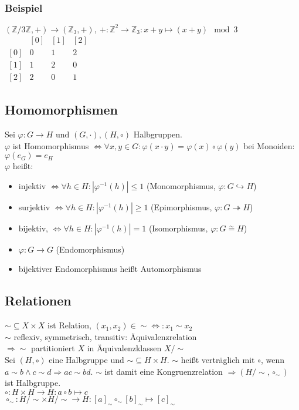     \subsubsection{Beispiel}
    $(\mathds{Z}/3\mathds{Z},+)\rightarrow (\mathds{Z}_3,+),\ +:\mathds{Z}^2\rightarrow \mathds{Z}_3:x+y\mapsto (x+y)\mod 3$\\
    \begin{math}
        \begin{array}
            {c|ccc}
            & \left[0\right] & \left[1\right] & \left[2\right]\\\hline
            \left[0\right] & 0 & 1 & 2\\
            \left[1\right] & 1 & 2 & 0\\
            \left[2\right] & 2 & 0 & 1
        \end{array}
    \end{math}
    \subsection{Homomorphismen}
        Sei $\varphi: G\rightarrow H$ und $(G,\cdot),(H,\circ)$ Halbgruppen.\\
        $\varphi$ ist Homomorphismus $\Leftrightarrow\forall x,y\in G: \varphi(x\cdot y)=\varphi(x)\circ\varphi(y)$ bei Monoiden: $\varphi(e_G)=e_H$\\
        $\varphi$ heißt:
        \begin{itemize}
            \item injektiv $\Leftrightarrow\forall h\in H:|\varphi^{-1}(h)|\le 1$ (Monomorphismus, $\varphi: G \hookrightarrow H$)
            \item surjektiv $\Leftrightarrow\forall h\in H:|\varphi^{-1}(h)|\ge 1$ (Epimorphismus, $\varphi: G\twoheadrightarrow H$)
            \item bijektiv, $\Leftrightarrow\forall h\in H:|\varphi^{-1}(h)|= 1$ (Isomorphismus, $\varphi: G \overset{\sim}{=} H$)
            \item $\varphi : G\rightarrow G$ (Endomorphismus)
            \item bijektiver Endomorphismus heißt Automorphismus
        \end{itemize}
    \subsection{Relationen}
        $\sim\subseteq X\times X$ ist Relation, $(x_1,x_2)\in\sim\Leftrightarrow : x_1\sim x_2$\\
        $\sim$ reflexiv, symmetrisch, transitiv: Äquivalenzrelation\\
        \indent$\Rightarrow \sim$ partitioniert $X$ in Äquivalenzklassen $X/\sim$\\
        Sei $(H,\circ)$ eine Halbgruppe und $\sim\subseteq H\times H$. $\sim$ heißt verträglich mit $\circ$, wenn $a\sim b\wedge c\sim d\Rightarrow ac\sim bd$. $\sim$ ist damit eine Kongruenzrelation $\Rightarrow (H/\sim,\circ_\sim)$ ist Halbgruppe.\\
        $\circ: H\times H\rightarrow H: a\circ b\mapsto c$\\
        $\circ_\sim: H/\sim\times H/\sim\rightarrow H: [a]_\sim\circ_\sim [b]_\sim\mapsto [c]_\sim$
